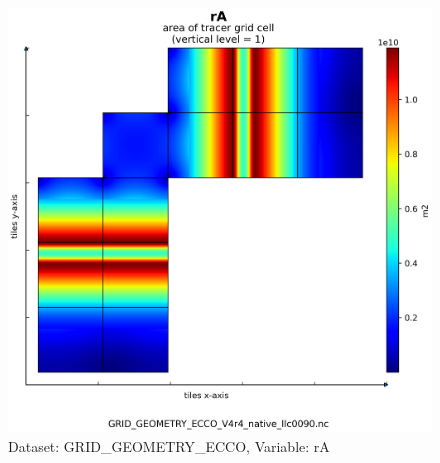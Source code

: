 \begin{figure}[H]
\centering
\includegraphics[scale=0.55]{../images/plots/native_plots_coords/Geometry_Parameters_for_the_Lat-Lon-Cap_90_(llc90)_Native_Model_Grid_(Version_4_Release_4)/rA.png}
\caption{Dataset: GRID\_GEOMETRY\_ECCO, Variable: rA}
\label{tab:table-GRID_GEOMETRY_ECCO_rA-Plot}
\end{figure}
\newpage
\pagebreak
